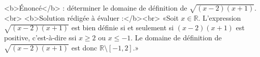 <b>Énoncé</b> : déterminer le domaine de définition de $\sqrt{(x-2)(x+1)}$.<br> <b>Solution rédigée à évaluer :</b><br>  «Soit $x\in\mathbb{R}$.  L'expression $\sqrt{(x-2)(x+1)}$ est bien définie si et seulement si $(x-2)(x+1)$ est positive, c'est-à-dire ssi $x\geq 2$ ou $x\leq -1$. Le domaine de définition de $\sqrt{(x-2)(x+1)}$ est donc $\mathbb{R}\setminus [-1,2]$.»

\begin{reponses}
\end{reponses}

\begin{comment}
Erreur sur l'exclusion des bornes.
\end{comment}

